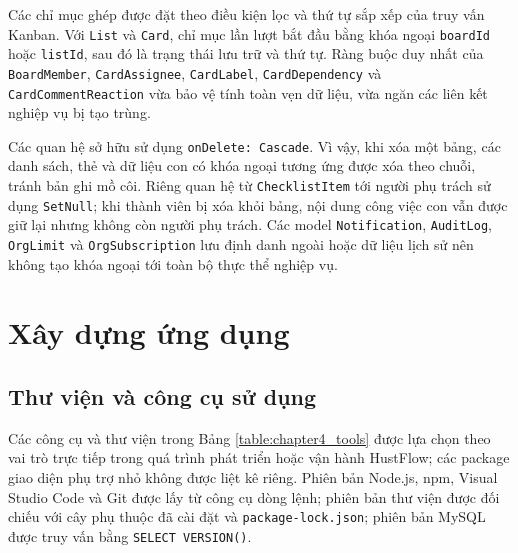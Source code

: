 \documentclass[../DoAn.tex]{subfiles}
\begin{document}
Các chỉ mục ghép được đặt theo điều kiện lọc và thứ tự sắp xếp của truy vấn Kanban. Với \texttt{List} và \texttt{Card}, chỉ mục lần lượt bắt đầu bằng khóa ngoại \texttt{boardId} hoặc \texttt{listId}, sau đó là trạng thái lưu trữ và thứ tự. Ràng buộc duy nhất của \texttt{BoardMember}, \texttt{CardAssignee}, \texttt{CardLabel}, \texttt{CardDependency} và \texttt{CardCommentReaction} vừa bảo vệ tính toàn vẹn dữ liệu, vừa ngăn các liên kết nghiệp vụ bị tạo trùng.

Các quan hệ sở hữu sử dụng \texttt{onDelete: Cascade}. Vì vậy, khi xóa một bảng, các danh sách, thẻ và dữ liệu con có khóa ngoại tương ứng được xóa theo chuỗi, tránh bản ghi mồ côi. Riêng quan hệ từ \texttt{ChecklistItem} tới người phụ trách sử dụng \texttt{SetNull}; khi thành viên bị xóa khỏi bảng, nội dung công việc con vẫn được giữ lại nhưng không còn người phụ trách. Các model \texttt{Notification}, \texttt{AuditLog}, \texttt{OrgLimit} và \texttt{OrgSubscription} lưu định danh ngoài hoặc dữ liệu lịch sử nên không tạo khóa ngoại tới toàn bộ thực thể nghiệp vụ.

\section{Xây dựng ứng dụng}
\label{section:4.3}

\subsection{Thư viện và công cụ sử dụng}
\label{subsection:4.3.1}

Các công cụ và thư viện trong Bảng \ref{table:chapter4_tools} được lựa chọn theo vai trò trực tiếp trong quá trình phát triển hoặc vận hành HustFlow; các package giao diện phụ trợ nhỏ không được liệt kê riêng. Phiên bản Node.js, npm, Visual Studio Code và Git được lấy từ công cụ dòng lệnh; phiên bản thư viện được đối chiếu với cây phụ thuộc đã cài đặt và \texttt{package-lock.json}; phiên bản MySQL được truy vấn bằng \texttt{SELECT VERSION()}.
\end{document}
